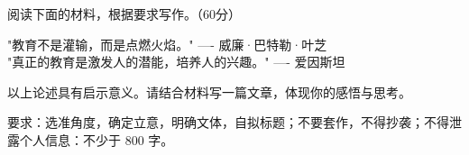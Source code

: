 \documentclass[zihao = -4]{exam-zh}
\begin{document}
       \begin{question}
         阅读下面的材料，根据要求写作。（60分）
       \end{question}

       \begin{material}
         "教育不是灌输，而是点燃火焰。" 
---- 威廉·巴特勒·叶芝
\\
         "真正的教育是激发人的潜能，培养人的兴趣。" 
---- 爱因斯坦
\\
       \end{material}

       以上论述具有启示意义。请结合材料写一篇文章，体现你的感悟与思考。

       要求：选准角度，确定立意，明确文体，自拟标题；不要套作，不得抄袭；不得泄露个人信息：不少于 800 字。

       
\end{document}
